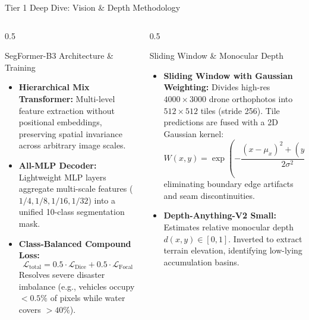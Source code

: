 \documentclass[aspectratio=169, 10pt, professionalfonts]{beamer}
\begin{document}
\begin{frame}{Tier 1 Deep Dive: Vision \& Depth Methodology}
  \begin{columns}[T]
    \begin{column}{0.5\textwidth}
      \begin{block}{SegFormer-B3 Architecture \& Training}
        \begin{itemize}\setlength{\itemsep}{0.4em}\footnotesize
          \item \textbf{Hierarchical Mix Transformer:} Multi-level feature extraction without positional embeddings, preserving spatial invariance across arbitrary image scales.
          \item \textbf{All-MLP Decoder:} Lightweight MLP layers aggregate multi-scale features ($1/4, 1/8, 1/16, 1/32$) into a unified 10-class segmentation mask.
          \item \textbf{Class-Balanced Compound Loss:}
            $$\mathcal{L}_{\text{total}} = 0.5 \cdot \mathcal{L}_{\text{Dice}} + 0.5 \cdot \mathcal{L}_{\text{Focal}}$$
            Resolves severe disaster imbalance (e.g., vehicles occupy $<0.5\%$ of pixels while water covers $>40\%$).
        \end{itemize}
      \end{block}
    \end{column}
    
    \begin{column}{0.5\textwidth}
      \begin{block}{Sliding Window \& Monocular Depth}
        \begin{itemize}\setlength{\itemsep}{0.4em}\footnotesize
          \item \textbf{Sliding Window with Gaussian Weighting:} Divides high-res $4000\times3000$ drone orthophotos into $512\times512$ tiles (stride 256). Tile predictions are fused with a 2D Gaussian kernel:
            $$W(x, y) = \exp\left( -\frac{(x - \mu_x)^2 + (y - \mu_y)^2}{2\sigma^2} \right)$$
            eliminating boundary edge artifacts and seam discontinuities.
          \item \textbf{Depth-Anything-V2 Small:} Estimates relative monocular depth $d(x,y) \in [0, 1]$. Inverted to extract terrain elevation, identifying low-lying accumulation basins.
        \end{itemize}
      \end{block}
    \end{column}
  \end{columns}
\end{frame}
\end{document}
